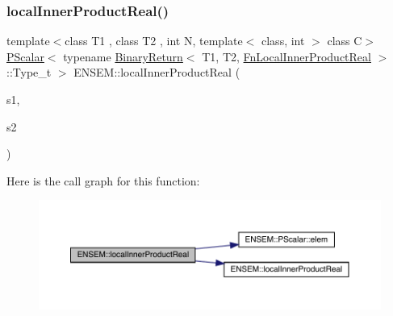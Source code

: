 \subsubsection{\texorpdfstring{localInnerProductReal()}{localInnerProductReal()}}
{\footnotesize\ttfamily template$<$class T1 , class T2 , int N, template$<$ class, int $>$ class C$>$ \\
\mbox{\hyperlink{classENSEM_1_1PScalar}{P\+Scalar}}$<$ typename \mbox{\hyperlink{structENSEM_1_1BinaryReturn}{Binary\+Return}}$<$ T1, T2, \mbox{\hyperlink{structENSEM_1_1FnLocalInnerProductReal}{Fn\+Local\+Inner\+Product\+Real}} $>$\+::Type\+\_\+t $>$ E\+N\+S\+E\+M\+::local\+Inner\+Product\+Real (\begin{DoxyParamCaption}\item[{const \mbox{\hyperlink{classENSEM_1_1PVector}{P\+Vector}}$<$ T1, \mbox{\hyperlink{operator__name__util_8cc_a7722c8ecbb62d99aee7ce68b1752f337}{N}}, C $>$ \&}]{s1,  }\item[{const \mbox{\hyperlink{classENSEM_1_1PVector}{P\+Vector}}$<$ T2, \mbox{\hyperlink{operator__name__util_8cc_a7722c8ecbb62d99aee7ce68b1752f337}{N}}, C $>$ \&}]{s2 }\end{DoxyParamCaption})\hspace{0.3cm}{\ttfamily [inline]}}

Here is the call graph for this function\+:\nopagebreak
\begin{figure}[H]
\begin{center}
\leavevmode
\includegraphics[width=350pt]{d3/dc4/group__primvector_gad425d93792f21129cff7411c89c12d80_cgraph}
\end{center}
\end{figure}
\mbox{\label{group__primvector_ga50edf2bff5393989dac9f89e511257be}} 
